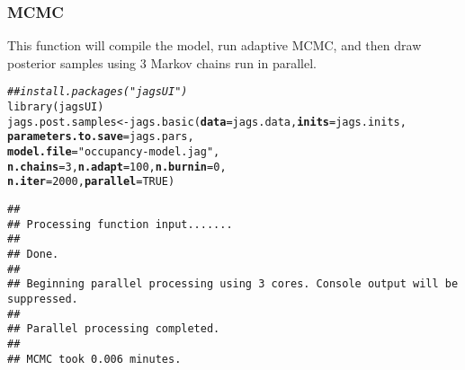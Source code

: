 \documentclass[color=usenames,dvipsnames]{beamer}\usepackage[]{graphicx}\usepackage[]{color}
\makeatletter
\newcommand{\hlnum}[1]{\textcolor[rgb]{0.69,0.494,0}{#1}}%
\newcommand{\hlstr}[1]{\textcolor[rgb]{0.749,0.012,0.012}{#1}}%
\newcommand{\hlcom}[1]{\textcolor[rgb]{0.514,0.506,0.514}{\textit{#1}}}%
\newcommand{\hlstd}[1]{\textcolor[rgb]{0,0,0}{#1}}%
\newcommand{\hlkwb}[1]{\textcolor[rgb]{0,0.341,0.682}{#1}}%
\newcommand{\hlkwc}[1]{\textcolor[rgb]{0,0,0}{\textbf{#1}}}%
\newcommand{\hlkwd}[1]{\textcolor[rgb]{0.004,0.004,0.506}{#1}}%
\newenvironment{kframe}{%
 \def\at@end@of@kframe{}%
 \ifinner\ifhmode%
  \def\at@end@of@kframe{\end{minipage}}%
  \begin{minipage}{\columnwidth}%
 \fi\fi%
 \def\FrameCommand##1{\hskip\@totalleftmargin \hskip-\fboxsep
 \colorbox{shadecolor}{##1}\hskip-\fboxsep
     \hskip-\linewidth \hskip-\@totalleftmargin \hskip\columnwidth}%
 \MakeFramed {\advance\hsize-\width
   \@totalleftmargin\z@ \linewidth\hsize
   \@setminipage}}%
 {\par\unskip\endMakeFramed%
 \at@end@of@kframe}
\newenvironment{knitrout}{}{} %
\makeatother
\begin{document}
\begin{frame}[fragile]
  \frametitle{MCMC}
  \small
  This function will compile the model, run adaptive MCMC, and then
  draw posterior samples using 3 Markov chains run in parallel. \\
\begin{knitrout}\scriptsize
{}\color{fgcolor}\begin{kframe}
\begin{alltt}
\hlcom{## install.packages("jagsUI")}
\hlkwd{library}\hlstd{(jagsUI)}
\hlstd{jags.post.samples} \hlkwb{<-} \hlkwd{jags.basic}\hlstd{(}\hlkwc{data}\hlstd{=jags.data,} \hlkwc{inits}\hlstd{=jags.inits,}
                                \hlkwc{parameters.to.save}\hlstd{=jags.pars,}
                                \hlkwc{model.file}\hlstd{=}\hlstr{"occupancy-model.jag"}\hlstd{,}
                                \hlkwc{n.chains}\hlstd{=}\hlnum{3}\hlstd{,} \hlkwc{n.adapt}\hlstd{=}\hlnum{100}\hlstd{,} \hlkwc{n.burnin}\hlstd{=}\hlnum{0}\hlstd{,}
                                \hlkwc{n.iter}\hlstd{=}\hlnum{2000}\hlstd{,} \hlkwc{parallel}\hlstd{=}\hlnum{TRUE}\hlstd{)}
\end{alltt}
\begin{verbatim}
## 
## Processing function input....... 
## 
## Done. 
##  
## Beginning parallel processing using 3 cores. Console output will be suppressed.
## 
## Parallel processing completed.
## 
## MCMC took 0.006 minutes.
\end{verbatim}
\end{kframe}
\end{knitrout}
\end{frame}
\end{document}
